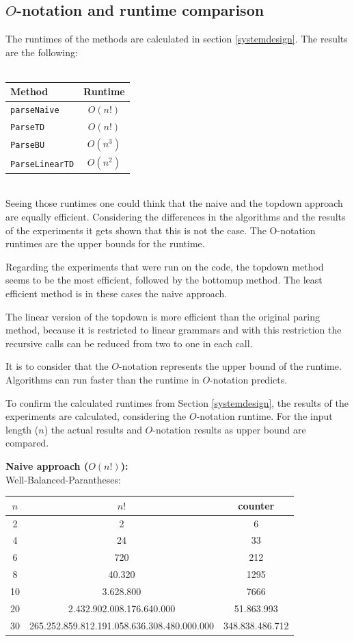 \documentclass[a4paper, 11pt]{article}
\begin{document}
\subsection{$O$-notation and runtime comparison}
\label{runtime}


The runtimes of the methods are calculated in section \ref{systemdesign}. The results are the following:
\ \\ \\
\begin{tabular}{|l|c|}
\hline
Method & Runtime \\
\hline
\texttt{parseNaive} & $O(n!)$\\
\texttt{ParseTD} & $O(n!)$ \\
\texttt{ParseBU} & $O(n^3)$\\
\texttt{ParseLinearTD} & $O(n^2)$\\
\hline
\end{tabular}

\ \\
Seeing those runtimes one could think that the naive and the topdown approach are equally efficient. Considering the differences in the algorithms and the results of the experiments it gets shown that this is not the case. The O-notation runtimes are the upper bounds for the runtime. 

Regarding the experiments that were run on the code, the topdown method seems to be the most efficient, followed by the bottomup method. The least efficient method is in these cases the naive approach.

The linear version of the topdown is more efficient than the original paring method, because it is restricted to linear grammars and with this restriction the recursive calls can be reduced from two to one in each call.

It is to consider that the $O$-notation represents the upper bound of the runtime. Algorithms can run faster than the runtime in $O$-notation predicts.

To confirm the calculated runtimes from Section \ref{systemdesign}, the results of the experiments are calculated, considering the $O$-notation runtime. For the input length ($n$) the actual results and $O$-notation results as upper bound are compared.

\newpage
\textbf{Naive approach ($O(n!)$):} \\
Well-Balanced-Parantheses: 

\begin{tabular}{|c|c|c|}
\hline
$n$ & $n!$ & counter \\
\hline
2& 2 & 6\\
4& 24 & 33\\
6& 720 & 212\\
8& 40.320 & 1295\\
10& 3.628.800 &7666 \\
20& 2.432.902.008.176.640.000 & 51.863.993\\
30& 265.252.859.812.191.058.636.308.480.000.000 & 348.838.486.712\\
\hline
\end{tabular}
\end{document}
